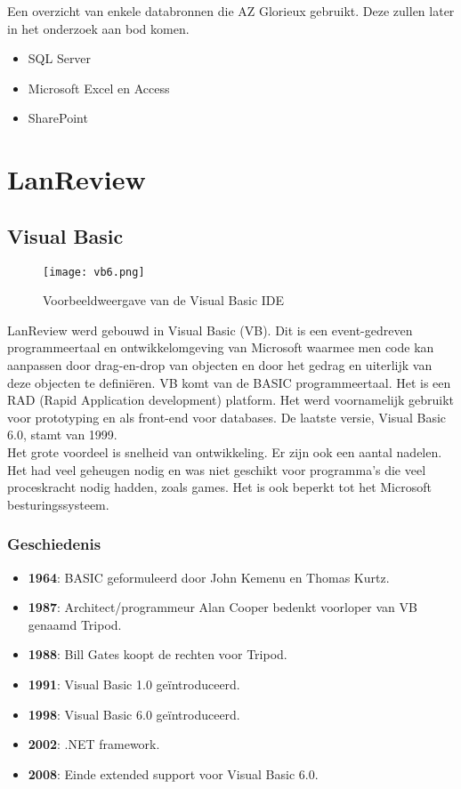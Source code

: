 Een overzicht van enkele databronnen die AZ Glorieux gebruikt. Deze zullen later in het onderzoek aan bod komen.

\begin{itemize}
    \item SQL Server
    \item Microsoft Excel en Access
    \item SharePoint
\end{itemize}

\section{LanReview}

\subsection{Visual Basic}

\begin{figure}[h!]
    \texttt{[image: vb6.png]}
    \caption{Voorbeeldweergave van de Visual Basic IDE \autocite{Speed2020}}
    \label{fig:vb6ide}
\end{figure}

LanReview werd gebouwd in Visual Basic (VB). Dit is een event-gedreven programmeertaal en ontwikkelomgeving van Microsoft waarmee men code kan aanpassen door drag-en-drop van objecten en door het gedrag en uiterlijk van deze objecten te definiëren. VB komt van de BASIC programmeertaal. Het is een RAD (Rapid Application development) platform. Het werd voornamelijk gebruikt voor prototyping en als front-end voor databases. De laatste versie, Visual Basic 6.0, stamt van 1999.\\
Het grote voordeel is snelheid van ontwikkeling. Er zijn ook een aantal nadelen.
Het had veel geheugen nodig en was niet geschikt voor programma's die veel proceskracht nodig hadden, zoals games. Het is ook beperkt tot het Microsoft besturingssysteem.

\autocite{Rouse2019}

\subsubsection{Geschiedenis}

\begin{itemize}
    \item \textbf{1964}: BASIC geformuleerd door John Kemenu en Thomas Kurtz.
    \item \textbf{1987}: Architect/programmeur Alan Cooper bedenkt voorloper van VB genaamd Tripod.
    \item \textbf{1988}: Bill Gates koopt de rechten voor Tripod.
    \item \textbf{1991}: Visual Basic 1.0 geïntroduceerd.
    \item \textbf{1998}: Visual Basic 6.0 geïntroduceerd.
    \item \textbf{2002}: .NET framework.
    \item \textbf{2008}: Einde extended support voor Visual Basic 6.0.
\end{itemize} \autocite{Grigonis2014}

